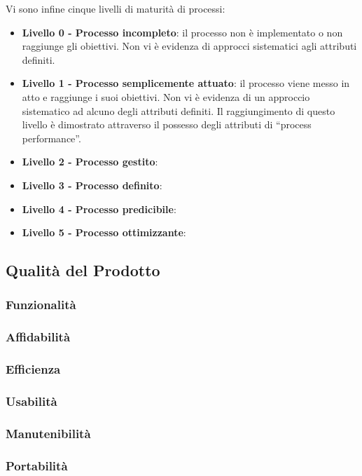 \smallskip
Vi sono infine cinque livelli di maturità di processi:
\smallskip
\begin{itemize}
	\item \textbf{Livello 0 - Processo incompleto}: il processo non è implementato o non raggiunge gli obiettivi. Non vi è evidenza di approcci sistematici agli
	attributi definiti.
	\item \textbf{Livello 1 - Processo semplicemente attuato}: il processo viene messo in atto e raggiunge i suoi obiettivi. Non vi è evidenza di un approccio sistematico ad alcuno degli attributi definiti. Il raggiungimento di questo livello è dimostrato attraverso il possesso degli attributi di ``process performance''.
	\item \textbf{Livello 2 - Processo gestito}:
	\item \textbf{Livello 3 - Processo definito}:
	\item \textbf{Livello 4 - Processo predicibile}:
	\item \textbf{Livello 5 - Processo ottimizzante}:
\end{itemize}

\subsection{Qualità del Prodotto}
\subsubsection{Funzionalità}
\subsubsection{Affidabilità}
\subsubsection{Efficienza}
\subsubsection{Usabilità}
\subsubsection{Manutenibilità}
\subsubsection{Portabilità}